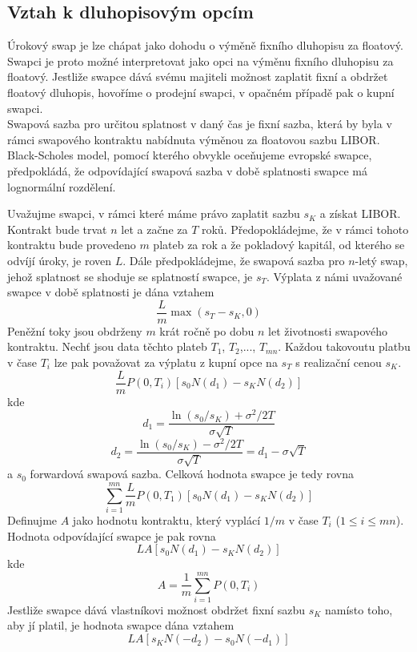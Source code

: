 \documentclass[a4paper]{book}
\begin{document}
\subsection{Vztah k dluhopisovým opcím}

Úrokový swap je lze chápat jako dohodu o výměně fixního dluhopisu za floatový. Swapci je proto možné interpretovat jako opci na výměnu fixního dluhopisu za floatový. Jestliže swapce dává svému majiteli možnost zaplatit fixní a obdržet floatový dluhopis, hovoříme o prodejní swapci, v opačném případě pak o kupní swapci.
\\

Swapová sazba pro určitou splatnost v daný čas je fixní sazba, která by byla v rámci swapového kontraktu nabídnuta výměnou za floatovou sazbu LIBOR. Black-Scholes model, pomocí kterého obvykle oceňujeme evropské swapce, předpokládá, že odpovídající swapová sazba v době splatnosti swapce má lognormální rozdělení.

Uvažujme swapci, v rámci které máme právo zaplatit sazbu $s_K$ a získat LIBOR. Kontrakt bude trvat $n$ let a začne za $T$ roků. Předopokládejme, že v rámci tohoto kontraktu bude provedeno $m$ plateb za rok a že pokladový kapitál, od kterého se odvíjí úroky, je roven $L$. Dále předpokládejme, že swapová sazba pro $n$-letý swap, jehož splatnost se shoduje se splatností swapce, je $s_T$. Výplata z námi uvažované swapce v době splatnosti je dána vztahem
\begin{equation*}
\frac{L}{m}\max(s_T-s_K, 0)
\end{equation*}
Peněžní toky jsou obdrženy $m$ krát ročně po dobu $n$ let životnosti swapového kontraktu. Nechť jsou data těchto plateb $T_1$, $T_2$,..., $T_{mn}$. Každou takovoutu platbu v čase $T_i$ lze pak považovat za výplatu z kupní opce na $s_T$ s realizační cenou $s_K$.
\begin{equation*}
\frac{L}{m}P(0, T_i)[s_0N(d_1) - s_K N(d_2)]
\end{equation*}
kde
\begin{equation*}
d_1 = \frac{\ln(s_0/s_K)+\sigma^2/2 T}{\sigma \sqrt{T}}
\end{equation*}
\begin{equation*}
d_2 = \frac{\ln(s_0/s_K)-\sigma^2/2 T}{\sigma \sqrt{T}}= d_1 - \sigma \sqrt{T} 
\end{equation*}
a $s_0$ forwardová swapová sazba. Celková hodnota swapce je tedy rovna
\begin{equation*}
\sum^{mn}_{i=1} \frac{L}{m} P(0, T_1)[s_0N(d_1)-s_KN(d_2)]
\end{equation*}
Definujme $A$ jako hodnotu kontraktu, který vyplácí $1/m$ v čase $T_i$ ($1 \leq i \leq mn$). Hodnota odpovídající swapce je pak rovna
\begin{equation}
LA[s_0N(d_1) - s_KN(d_2)]
\end{equation}
kde
\begin{equation*}
A = \frac{1}{m} \sum^{mn}_{i=1}P(0, T_i)
\end{equation*}
Jestliže swapce dává vlastníkovi možnost obdržet fixní sazbu $s_K$ namísto toho, aby jí platil, je hodnota swapce dána vztahem
\begin{equation*}
LA[s_KN(-d_2) - s_0N(-d_1)]
\end{equation*}
\end{document}
